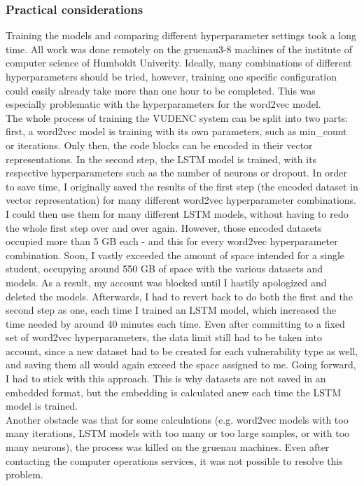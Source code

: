 \documentclass[
	a4paper,
	pagesize,
	pdftex,
	12pt,
	twoside, %
	BCOR=5mm, %
	ngerman,
	fleqn,
	final,
	]{scrartcl}
\begin{document}
\subsubsection{Practical considerations}
Training the models and comparing different hyperparameter settings took a long time. All work was done remotely on the gruenau3-8 machines of the institute of computer science of Humboldt Univerity. Ideally, many combinations of different hyperparameters should be tried, however, training one specific configuration could easily already take more than one hour to be completed. This was especially problematic with the hyperparameters for the word2vec model.\\
The whole process of training the VUDENC system can be split into two parts: first, a word2vec model is training with its own parameters, such as min\_count or iterations. Only then, the code blocks can be encoded in their vector representations. In the second step, the LSTM model is trained, with its respective hyperparameters such as the number of neurons or dropout. In order to save time, I originally saved the results of the first step (the encoded dataset in vector representation) for many different word2vec hyperparameter combinations. I could then use them for many different LSTM models, without having to redo the whole first step over and over again. However, those encoded datasets occupied more than 5 GB each - and this for every word2vec hyperparameter combination. Soon, I vastly exceeded the amount of space intended for a single student, occupying around 550 GB of space with the various datasets and models. As a result, my account was blocked until I hastily apologized and deleted the models. Afterwards, I had to revert back to do both the first and the second step as one, each time I trained an LSTM model, which increased the time needed by around 40 minutes each time. Even after committing to a fixed set of word2vec hyperparameters, the data limit still had to be taken into account, since a new dataset had to be created for each vulnerability type as well, and saving them all would again exceed the space assigned to me. Going forward, I had to stick with this approach. This is why datasets are not saved in an embedded format, but the embedding is calculated anew each time the LSTM model is trained.\\
Another obstacle was that for some calculations (e.g. word2vec models with too many iterations, LSTM models with too many or too large samples, or with too many neurons), the process was killed on the gruenau machines. Even after contacting the computer operations services, it was not possible to resolve this problem.\\
\end{document}
